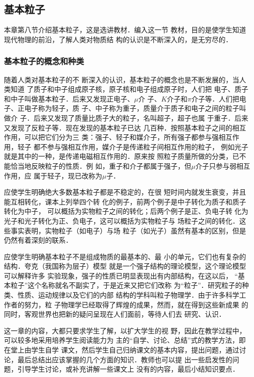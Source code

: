 \subsection{基本粒子}
本章第八节介绍基本粒子，这是选讲教材．编入这一节
教材，目的是使学生知道现代物理的前沿，了解人类对物质结
构的认识是不断深入的，是无穷尽的．

\subsubsection{基本粒子的概念和种类}

随着人类对基本粒子的不
断深入的认识，基本粒子的概念也是不断发展的，当人类知道
了质子和中子组成原子核，原子核和电子组成原子时，人们把
电子、质子和中子叫做基本粒子．后来又发现正电子、$\mu$介
子、$K$介子和$\pi$介子等．人们把电子、正电子称为轻子，质
子、中子称为重子，质量介于质子和电子之间的粒子叫做介
子．后来又发现了质量比质子大的粒子，名叫超子，超子也属
于重子．后来又发现了反粒子等．现在发现的基本粒子已达
几百种．按照基本粒子之间的相互作用，可以把它们分为三
类：强子、轻子和媒介子，所有强子都参与强相互作用，轻子
都不参与强相互作用，媒介子是传递粒子间相互作用的粒子，
例如光子就是其中的一种，是传递电磁相互作用的．原来按
照粒子质量所做的分类，已不能恰当地反映粒子的性质．例
如，重子和介子都属于强子，但$\mu$介子只参与弱相互作用，应
属于轻子，现已改称为$\mu$子．

应使学生明确绝大多数基本粒子都是不稳定的，在很
短时间内就发生衰变，并且能互相转化，课本上列举四个转
化的例子，前两个例子是中子转化为质子和质子转化为中子，
可以概括为实物粒子之间的转化；后两个例子是正、负电子转
化为光子和光子转化为正、负电子，这可以概括为实物粒子与
场粒子之间的转化．这些事实表明，实物粒子（如电子）与场
粒子（如光子）虽然有基本的区别，但是仍然有着深刻的联系．

应使学生明确基本粒子不是组成物质的最基本的、最
小的单元，它们也有复杂的结构．夸克（我国称为层子）模型
就是一个强子结构的理论模型，这个理论模型可以解释许多
实验现象，强子的性质已明显表现出有内部结构，在这以后，
“基本粒子”这个名称就名不副实了，于是近来又把它们改称
为“粒子”．研究粒子的种类、性质、运动规律以及它们的内部
结构的学科叫粒子物理学．由于许多科学工作者的努力，粒
子物理学已经取得了辉煌的成果，然而，就在得到这些新成果
的同时，客观世界也把新的疑问呈现在人们面前，等待人们去
研究、认识．

这一章的内容，大都只要求学生了解，以扩大学生的视
野，因此在教学过程中，可以较多地采用培养学生阅读能力为
主的“自学、讨论、总结”式的教学方法，即在堂上由学生自学
课文，然后学生自己归纳课文的基本内容，提出问题，通过讨
论，最后总结出应该掌握的几个方面的知识．教师也可以提
出一些启发性的问题，引导学生讨论，或补充讲解一些课文上
没有的内容，最后小结知识要点．

